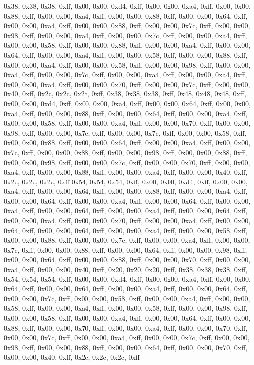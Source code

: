 0x38, 0x38, 0x38, 0xff, 0x00, 0x00, 0xd4, 0xff, 0x00, 0x00, 0xa4, 0xff, 0x00, 0x00, 0x88, 0xff, 0x00, 0x00, 0xa4, 0xff, 0x00, 0x00, 0x88, 0xff, 0x00, 0x00, 0x64, 0xff, 0x00, 0x00, 0xa4, 0xff, 0x00, 0x00, 0x88, 0xff, 0x00, 0x00, 0x7c, 0xff, 0x00, 0x00, 0x98, 0xff, 0x00, 0x00, 0xa4, 0xff, 0x00, 0x00, 0x7c, 0xff, 0x00, 0x00, 0xa4, 0xff, 0x00, 0x00, 0x58, 0xff, 0x00, 0x00, 0x88, 0xff, 0x00, 0x00, 0xa4, 0xff, 0x00, 0x00, 0x64, 0xff, 0x00, 0x00, 0xa4, 0xff, 0x00, 0x00, 0x58, 0xff, 0x00, 0x00, 0x88, 0xff, 0x00, 0x00, 0xa4, 0xff, 0x00, 0x00, 0x58, 0xff, 0x00, 0x00, 0x98, 0xff, 0x00, 0x00, 0xa4, 0xff, 0x00, 0x00, 0x7c, 0xff, 0x00, 0x00, 0xa4, 0xff, 0x00, 0x00, 0xa4, 0xff, 0x00, 0x00, 0xa4, 0xff, 0x00, 0x00, 0x70, 0xff, 0x00, 0x00, 0x7c, 0xff, 0x00, 0x00, 0x40, 0xff, 0x2c, 0x2c, 0x2c, 0xff, 0x38, 0x38, 0x38, 0xff, 0x48, 0x48, 0x48, 0xff, 0x00, 0x00, 0xd4, 0xff, 0x00, 0x00, 0xa4, 0xff, 0x00, 0x00, 0x64, 0xff, 0x00, 0x00, 0xa4, 0xff, 0x00, 0x00, 0x88, 0xff, 0x00, 0x00, 0x64, 0xff, 0x00, 0x00, 0xa4, 0xff, 0x00, 0x00, 0x58, 0xff, 0x00, 0x00, 0xa4, 0xff, 0x00, 0x00, 0x70, 0xff, 0x00, 0x00, 0x98, 0xff, 0x00, 0x00, 0x7c, 0xff, 0x00, 0x00, 0x7c, 0xff, 0x00, 0x00, 0x58, 0xff, 0x00, 0x00, 0x88, 0xff, 0x00, 0x00, 0x64, 0xff, 0x00, 0x00, 0xa4, 0xff, 0x00, 0x00, 0x7c, 0xff, 0x00, 0x00, 0x88, 0xff, 0x00, 0x00, 0x98, 0xff, 0x00, 0x00, 0x88, 0xff, 0x00, 0x00, 0x98, 0xff, 0x00, 0x00, 0x7c, 0xff, 0x00, 0x00, 0x70, 0xff, 0x00, 0x00, 0xa4, 0xff, 0x00, 0x00, 0x88, 0xff, 0x00, 0x00, 0xa4, 0xff, 0x00, 0x00, 0x40, 0xff, 0x2c, 0x2c, 0x2c, 0xff
0x54, 0x54, 0x54, 0xff, 0x00, 0x00, 0xd4, 0xff, 0x00, 0x00, 0xa4, 0xff, 0x00, 0x00, 0x64, 0xff, 0x00, 0x00, 0x88, 0xff, 0x00, 0x00, 0xa4, 0xff, 0x00, 0x00, 0x64, 0xff, 0x00, 0x00, 0xa4, 0xff, 0x00, 0x00, 0x64, 0xff, 0x00, 0x00, 0xa4, 0xff, 0x00, 0x00, 0x64, 0xff, 0x00, 0x00, 0xa4, 0xff, 0x00, 0x00, 0x64, 0xff, 0x00, 0x00, 0xa4, 0xff, 0x00, 0x00, 0x70, 0xff, 0x00, 0x00, 0xa4, 0xff, 0x00, 0x00, 0x64, 0xff, 0x00, 0x00, 0x64, 0xff, 0x00, 0x00, 0xa4, 0xff, 0x00, 0x00, 0x58, 0xff, 0x00, 0x00, 0x88, 0xff, 0x00, 0x00, 0x7c, 0xff, 0x00, 0x00, 0xa4, 0xff, 0x00, 0x00, 0x7c, 0xff, 0x00, 0x00, 0x88, 0xff, 0x00, 0x00, 0x64, 0xff, 0x00, 0x00, 0x98, 0xff, 0x00, 0x00, 0x64, 0xff, 0x00, 0x00, 0x88, 0xff, 0x00, 0x00, 0x70, 0xff, 0x00, 0x00, 0xa4, 0xff, 0x00, 0x00, 0x40, 0xff, 0x20, 0x20, 0x20, 0xff, 0x38, 0x38, 0x38, 0xff, 0x54, 0x54, 0x54, 0xff, 0x00, 0x00, 0xd4, 0xff, 0x00, 0x00, 0xa4, 0xff, 0x00, 0x00, 0x64, 0xff, 0x00, 0x00, 0x64, 0xff, 0x00, 0x00, 0xa4, 0xff, 0x00, 0x00, 0x64, 0xff, 0x00, 0x00, 0x7c, 0xff, 0x00, 0x00, 0x58, 0xff, 0x00, 0x00, 0xa4, 0xff, 0x00, 0x00, 0x58, 0xff, 0x00, 0x00, 0xa4, 0xff, 0x00, 0x00, 0x58, 0xff, 0x00, 0x00, 0x98, 0xff, 0x00, 0x00, 0x58, 0xff, 0x00, 0x00, 0xa4, 0xff, 0x00, 0x00, 0x64, 0xff, 0x00, 0x00, 0x88, 0xff, 0x00, 0x00, 0x70, 0xff, 0x00, 0x00, 0xa4, 0xff, 0x00, 0x00, 0x70, 0xff, 0x00, 0x00, 0x7c, 0xff, 0x00, 0x00, 0xa4, 0xff, 0x00, 0x00, 0x7c, 0xff, 0x00, 0x00, 0x98, 0xff, 0x00, 0x00, 0x88, 0xff, 0x00, 0x00, 0x64, 0xff, 0x00, 0x00, 0x70, 0xff, 0x00, 0x00, 0x40, 0xff, 0x2c, 0x2c, 0x2c, 0xff
